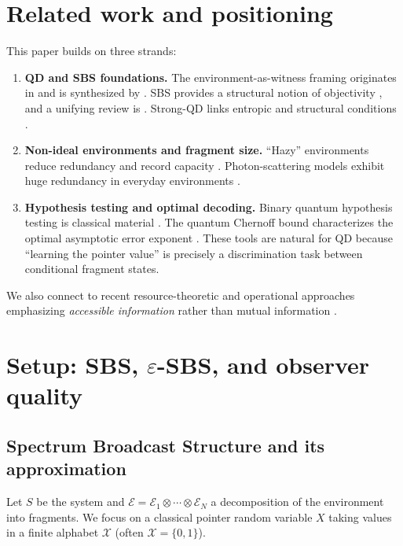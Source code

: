 \documentclass[11pt]{article}
\newcommand{\cE}{\mathcal{E}}
\newcommand{\cX}{\mathcal{X}}
\newcommand{\1}{\mathbf{1}}
\theoremstyle{definition}
\theoremstyle{plain}
\begin{document}
\section{Related work and positioning}

This paper builds on three strands:

\begin{enumerate}[leftmargin=2em]
\item \textbf{QD and SBS foundations.}
The environment-as-witness framing originates in \citet{OPZ2004} and is synthesized by \citet{Zurek2009,BlumeKohoutZurek2006}.
SBS provides a structural notion of objectivity \citep{HorodeckiKorbiczHorodecki2015}, and a unifying review is \citet{KorbiczReview2021}.
Strong-QD links entropic and structural conditions \citep{LeOlayaCastro2019}.
\item \textbf{Non-ideal environments and fragment size.}
``Hazy'' environments reduce redundancy and record capacity \citep{ZwolakQuanZurek2009}.
Photon-scattering models exhibit huge redundancy in everyday environments \citep{RiedelZurek2010,RiedelZurek2011}.
\item \textbf{Hypothesis testing and optimal decoding.}
Binary quantum hypothesis testing is classical material \citep{Helstrom1976,Watrous2018}.
The quantum Chernoff bound characterizes the optimal asymptotic error exponent \citep{Audenaert2007,NussbaumSzkola2009}.
These tools are natural for QD because ``learning the pointer value'' is precisely a discrimination task between conditional fragment states.
\end{enumerate}

We also connect to recent resource-theoretic and operational approaches emphasizing \emph{accessible information} rather than mutual information \citep{Touil2022}.

\section{Setup: SBS, $\varepsilon$-SBS, and observer quality}

\subsection{Spectrum Broadcast Structure and its approximation}

Let $S$ be the system and $\cE=\cE_1\otimes\cdots\otimes\cE_N$ a decomposition of the environment into fragments.
We focus on a classical pointer random variable $X$ taking values in a finite alphabet $\cX$ (often $\cX=\{0,1\}$).
\end{document}
